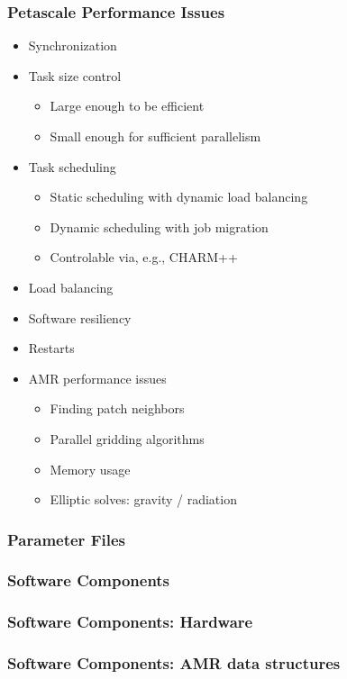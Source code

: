 \documentclass{beamer}
\begin{document}
    \begin{frame}[fragile] \frametitle{Petascale Performance Issues}
      \begin{itemize}
        \item Synchronization
        \item Task size control
        \begin{itemize}
          \item Large enough to be efficient
          \item Small enough for sufficient parallelism
        \end{itemize}
        \item Task scheduling
        \begin{itemize}
          \item Static scheduling with dynamic load balancing
          \item Dynamic scheduling with job migration
          \item Controlable via, e.g., CHARM++
        \end{itemize}
        \item Load balancing
        \item Software resiliency
        \item Restarts
        \item AMR performance issues
        \begin{itemize}
          \item Finding patch neighbors
          \item Parallel gridding algorithms
          \item Memory usage
          \item Elliptic solves: gravity / radiation
        \end{itemize}
      \end{itemize}
\end{frame}

    \begin{frame}[fragile] \frametitle{Parameter Files}
\end{frame}

    \begin{frame}[fragile] \frametitle{Software Components}
\end{frame}

    \begin{frame}[fragile] \frametitle{Software Components: Hardware}
\end{frame}

    \begin{frame}[fragile] \frametitle{Software Components: AMR data structures}
\end{frame}
\end{document}

